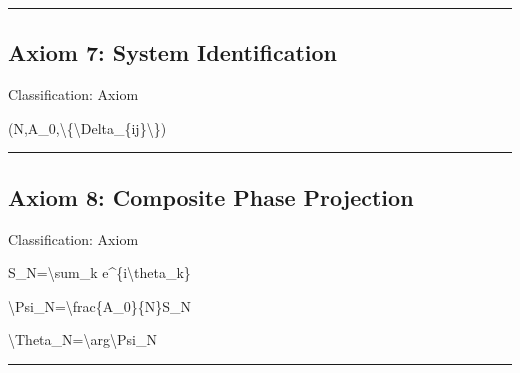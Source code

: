\documentclass[
  a4paper,
]{article}
\newenvironment{Shaded}{}{}
\newcommand{\NormalTok}[1]{#1}
\begin{document}
\begin{center}\rule{0.5\linewidth}{0.5pt}\end{center}

\subsection{Axiom 7: System
Identification}\label{axiom-7-system-identification}

Classification: Axiom

\begin{Shaded}
\begin{Highlighting}[]
\NormalTok{(N,A\_0,\textbackslash{}\{\textbackslash{}Delta\_\{ij\}\textbackslash{}\})}
\end{Highlighting}
\end{Shaded}

\begin{center}\rule{0.5\linewidth}{0.5pt}\end{center}

\subsection{Axiom 8: Composite Phase
Projection}\label{axiom-8-composite-phase-projection}

Classification: Axiom

\begin{Shaded}
\begin{Highlighting}[]
\NormalTok{S\_N=\textbackslash{}sum\_k e\^{}\{i\textbackslash{}theta\_k\}}
\end{Highlighting}
\end{Shaded}

\begin{Shaded}
\begin{Highlighting}[]
\NormalTok{\textbackslash{}Psi\_N=\textbackslash{}frac\{A\_0\}\{N\}S\_N}
\end{Highlighting}
\end{Shaded}

\begin{Shaded}
\begin{Highlighting}[]
\NormalTok{\textbackslash{}Theta\_N=\textbackslash{}arg\textbackslash{}Psi\_N}
\end{Highlighting}
\end{Shaded}

\begin{center}\rule{0.5\linewidth}{0.5pt}\end{center}
\end{document}
